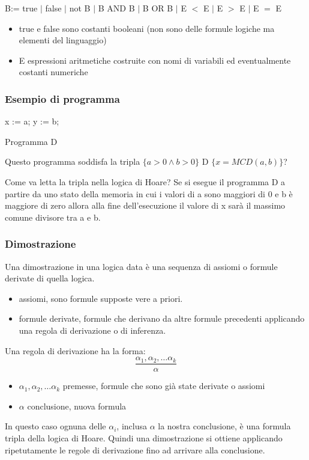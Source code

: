 B:= true $|$ false $|$ not B $|$ B AND B $|$ B OR B $|$ E $<$ E $|$ E $>$ E $|$ E $=$ E
\begin{itemize}
    \item true e false sono costanti booleani (non sono delle formule logiche ma elementi del linguaggio)
    \item E espressioni aritmetiche costruite con nomi di variabili ed eventualmente costanti numeriche
\end{itemize}

\subsubsection{Esempio di programma}
\begin{algorithm}[H]
    \SetAlgoLined
    x := a; y := b; \\
    \caption{Programma D}
\end{algorithm}

Questo programma soddisfa la tripla $\{a> 0 \land b > 0\}$ D $\{x = MCD(a,b)\}$?

Come va letta la tripla nella logica di Hoare? Se si esegue il programma D a partire da uno stato della memoria in cui i valori di a sono maggiori di 0 e b è maggiore di zero allora alla fine dell'esecuzione il valore di x  sarà il massimo comune divisore tra a e b.

\subsubsection{Dimostrazione}
Una dimostrazione in una logica data è una sequenza di assiomi o formule derivate di quella
logica. \begin{itemize}
    \item assiomi, sono formule supposte vere a priori.
    \item formule derivate,  formule che derivano da altre formule precedenti applicando una regola di derivazione o di inferenza.
\end{itemize}
Una regola di derivazione ha la forma:
$$\displaystyle \frac{\alpha_1, \alpha_2, \dots \alpha_k}{\alpha}$$ 
\begin{itemize}
    \item $\alpha_1, \alpha_2, \dots \alpha_k$  premesse, formule che sono già state derivate o assiomi
    \item $\alpha$ conclusione, nuova formula
\end{itemize}
In questo caso ognuna delle $\alpha_i$, inclusa $\alpha$ la nostra conclusione,  è una formula tripla della logica di Hoare.
Quindi una dimostrazione si ottiene applicando ripetutamente le regole di derivazione fino ad
arrivare alla conclusione.

